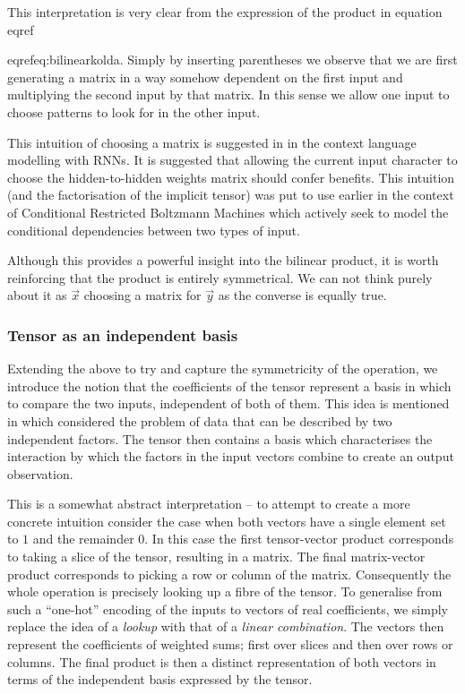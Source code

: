This interpretation is very clear from the expression of the product in
equation~\\eqref{eqref{eq:bilinearkolda}. Simply by inserting parentheses we observe that we are
first generating a matrix in a way somehow dependent on the first input and multiplying
the second input by that matrix. In this sense we allow one input to choose patterns to look for
in the other input.

This intuition of choosing a matrix is suggested in \autocite{Sutskever2013} in the
context language modelling with RNNs. It is suggested that allowing the current input
character to choose the hidden-to-hidden weights matrix should confer benefits. 
This intuition (and the factorisation of the implicit tensor) was put to use earlier in the context
of Conditional Restricted Boltzmann Machines \autocite{Taylor} which actively seek to model the
conditional dependencies between two types of input.

Although this provides a powerful insight into the bilinear product, it is worth reinforcing that
the product is entirely symmetrical. We can not think purely about it as \(\vec{x}\) choosing a matrix
for \(\vec{y}\) as the converse is equally true.

\subsubsection{Tensor as an independent basis}
Extending the above to try and capture the symmetricity of the operation, we introduce
the notion that the coefficients of the tensor represent a basis in which to compare the
two inputs, independent of both of them. This idea is mentioned in
 \autocite{Tenenbaum2000} which considered the problem of data that can be described by two
independent factors.
The tensor then contains a basis which characterises the interaction by which the factors
in the input vectors combine to create an output observation.

This is a somewhat abstract interpretation -- to attempt to create a more concrete
 intuition
consider the case when both vectors have a single element set to \(1\) and the remainder
\(0\). In this case the first tensor-vector product corresponds to taking a slice of the
tensor, resulting in a matrix. The final matrix-vector product corresponds to picking a
row or column of the matrix. Consequently the whole operation is precisely looking up
a fibre of the tensor. To generalise from such a ``one-hot'' encoding of the inputs
to vectors of real coefficients, we simply replace the idea of a
\emph{lookup} with that of a \emph{linear combination}. The vectors then represent the coefficients
of weighted sums; first over slices and then over rows or columns. The final product is then a
distinct representation of both vectors in terms of the independent basis expressed by the tensor.

}
